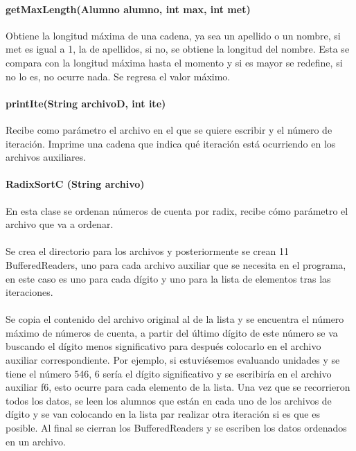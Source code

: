\documentclass[11pt]{article}
\begin{document}
\paragraph{getMaxLength(Alumno alumno, int max, int met)}
Obtiene la longitud máxima de una cadena, ya sea un apellido o un nombre, si met es igual a 1, la de apellidos, si no, se obtiene la longitud del nombre. Esta se compara con la longitud máxima hasta el momento y si es mayor se redefine, si no lo es, no ocurre nada. Se regresa el valor máximo. 

\paragraph{printIte(String archivoD, int ite) }
Recibe como parámetro el archivo en el que se quiere escribir y el número de iteración. Imprime una cadena que indica qué iteración está ocurriendo en los archivos auxiliares. 


\paragraph{RadixSortC (String archivo)}
En esta clase se ordenan números de cuenta por radix, recibe cómo parámetro el archivo que va a ordenar.  
\paragraph{}
Se crea el directorio para los archivos y posteriormente se crean 11 BufferedReaders, uno para cada archivo auxiliar que se necesita en el programa, en este caso es uno para cada dígito y uno para la lista de elementos tras las iteraciones. 
\paragraph{} 
Se copia el contenido del archivo original al de la lista y se encuentra el número máximo de números de cuenta, a partir del último dígito de este número se va buscando el dígito menos significativo para después colocarlo en el archivo auxiliar correspondiente. Por ejemplo, si estuviésemos evaluando unidades y se tiene el número 546, 6 sería el dígito significativo y se escribiría en el archivo auxiliar f6, esto ocurre para cada elemento de la lista. 
Una vez que se recorrieron todos los datos, se leen los alumnos que están en cada uno de los archivos de dígito y se van colocando en la lista par realizar otra iteración si es que es posible. 
Al final se cierran los BufferedReaders y se escriben los datos ordenados en un archivo.  
\end{document}
